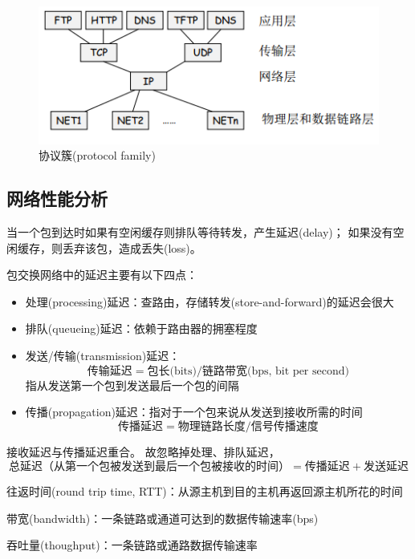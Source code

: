 \myhline
\begin{figure}[H]
	\centering
	\includegraphics[width=0.5\linewidth]{fig/protocol_family.png}
	\caption*{协议簇(protocol family)}
\end{figure}

\subsection{网络性能分析}
当一个包到达时如果有空闲缓存则排队等待转发，产生延迟(delay)；
如果没有空闲缓存，则丢弃该包，造成丢失(loss)。

包交换网络中的延迟主要有以下四点：
\begin{itemize}
	\item 处理(processing)延迟：查路由，存储转发(store-and-forward)的延迟会很大
	\item 排队(queueing)延迟：依赖于路由器的拥塞程度
	\item 发送/传输(transmission)延迟：\[\text{传输延迟}=\text{包长(bits)}/\text{链路带宽(bps, bit per second)}\]
	指从发送第一个包到发送最后一个包的间隔
	\item 传播(propagation)延迟：指对于一个包来说从发送到接收所需的时间
	\[\text{传播延迟}=\text{物理链路长度}/\text{信号传播速度}\]
\end{itemize}

接收延迟与传播延迟重合。
故忽略掉处理、排队延迟，
\[\text{总延迟（从第一个包被发送到最后一个包被接收的时间）}=\text{传播延迟}+\text{发送延迟}\]

\myhline
\par 往返时间(round trip time, RTT)：从源主机到目的主机再返回源主机所花的时间
\par 带宽(bandwidth)：一条链路或通道可达到的数据传输速率(bps)
\par 吞吐量(thoughput)：一条链路或通路数据传输速率

